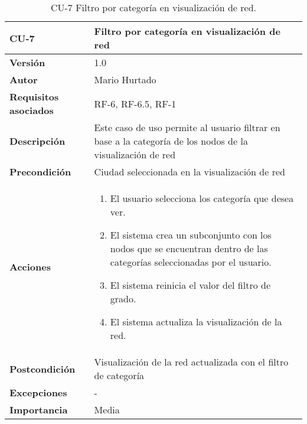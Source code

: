 \begin{table}[p]
	\centering
	\begin{tabularx}{\linewidth}{ p{} p{} }
			\toprule
			\textbf{CU-7}    & \textbf{Filtro por categoría en visualización de red}\\
			\toprule
			\textbf{Versión}              & 1.0    \\
			\textbf{Autor}                & Mario Hurtado \\
			\textbf{Requisitos asociados} & RF-6, RF-6.5, RF-1 \\
			\textbf{Descripción}          & Este caso de uso permite al usuario filtrar en base a la categoría de los nodos de la visualización de red\\
			\textbf{Precondición}         & Ciudad seleccionada en la visualización de red\\
			\textbf{Acciones}             &
			\begin{enumerate}
					\def\labelenumi{\arabic{enumi}.}
					\tightlist
					\item El usuario selecciona los categoría que desea ver.
					\item El sistema crea un subconjunto con los nodos que se encuentran dentro de las categorías seleccionadas por el usuario.
					\item El sistema reinicia el valor del filtro de grado.
					\item El sistema actualiza la visualización de la red.
				\end{enumerate}\\
			\textbf{Postcondición}        & Visualización de la red actualizada con el filtro de categoría\\
			\textbf{Excepciones}          & - \\
			\textbf{Importancia}          & Media \\
			\bottomrule
		\end{tabularx}
	\caption{CU-7 Filtro por categoría en visualización de red.}
\end{table}

